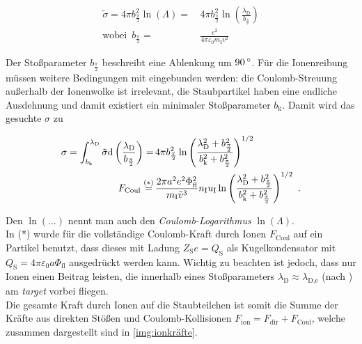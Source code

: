 \documentclass[numbers=noenddot,a4paper,notitlepage,twoside,BCOR15mm]{scrbook}
\newcommand{\degree}{^\circ}
\newcommand{\diff}{\textnormal{d}}
\newcommand{\ix}[1]{_\text{#1}}
\newcommand{\tilt}[1]{\textit{#1}}
\begin{document}
					\begin{align}
						\tilde{\sigma}=4\pi b_{\frac{\pi}{2}}^2\ln\left(\Lambda\right)=&\,4\pi b_{\frac{\pi}{2}}^2\ln\left(\frac{\lambda\ix{D}}{b_{\frac{\pi}{2}}}\right) \\
						\text{wobei }\, b_{\frac{\pi}{2}}=&\,\frac{e^2}{4\pi\varepsilon\ix{0}m\ix{I}v^2} \nonumber
					\end{align}

				Der Stoßparameter $b_{\frac{\pi}{2}}$ beschreibt eine Ablenkung um $\unit[90]{\degree}$. Für die Ionenreibung müssen weitere Bedingungen mit eingebunden werden: die Coulomb-Streuung außerhalb der Ionenwolke ist irrelevant, die Staubpartikel haben eine endliche Ausdehnung und damit existiert ein minimaler Stoßparameter $b\ix{k}$. Damit wird das gesuchte $\sigma$ zu

					\begin{align}
						\sigma=\int_{b\ix{k}}^{\lambda\ix{D}}\tilde{\sigma}\diff\left(\frac{\lambda\ix{D}}{b_{\frac{\pi}{2}}}\right)=&\,4\pi b_{\frac{\pi}{2}}^2\ln\left(\frac{\lambda\ix{D}^2+b_{\frac{\pi}{2}}^2}{b\ix{k}^2+b_{\frac{\pi}{2}}^2}\right)^{1/2} \nonumber \\
						F\ix{Coul}\overset{(*)}{=}&\,\frac{2\pi a^2 e^2\Phi\ix{fl}^2}{m\ix{I}\tilde{v}^3}n\ix{I}u\ix{I}\ln\left(\frac{\lambda\ix{D}^2+b_{\frac{\pi}{2}}^2}{b\ix{k}^2+b_{\frac{\pi}{2}}^2}\right)^{1/2} \, \, .
					\end{align}

				Den $\ln\left(\dots\right)$ nennt man auch den \tilt{Coulomb-Logarithmus} $\ln\left(\Lambda\right)$.\\
				In (*) wurde für die vollständige Coulomb-Kraft durch Ionen $F\ix{Coul}$ auf ein Partikel benutzt, dass dieses mit Ladung $Z\ix{S}e=Q\ix{S}$ als Kugelkondensator mit $Q\ix{S}=4\pi\varepsilon\ix{0}a\Phi\ix{fl}$ ausgedrückt werden kann. Wichtig zu beachten ist jedoch, dass nur Ionen einen Beitrag leisten, die innerhalb eines Stoßparameters $\lambda\ix{D}\approx\lambda\ix{D,e}$ (nach \cite{Kilgore93}) am \tilt{target} vorbei fliegen.\\
				Die gesamte Kraft durch Ionen auf die Staubteilchen ist somit die Summe der Kräfte aus direkten Stößen und Coulomb-Kollisionen $F\ix{ion}=F\ix{dir}+F\ix{Coul}$, welche zusammen dargestellt sind in \ref{img:ionkräfte}.
\end{document}
